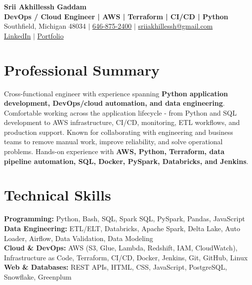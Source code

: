 \documentclass[letterpaper,10pt]{article}
\begin{document}
\fontsize{9.35pt}{10.45pt}\selectfont

\begin{center}
    {\LARGE \textbf{Srii Akhillessh Gaddam}} \\[-1pt]
    \textbf{DevOps / Cloud Engineer | AWS | Terraform | CI/CD | Python} \\[2pt]
    Southfield, Michigan 48034 $|$
    \href{tel:6468752400}{646-875-2400} $|$
    \href{mailto:sriiakhillessh@gmail.com}{sriiakhillessh@gmail.com} \\[1pt]
    \href{https://www.linkedin.com/in/srii-akhiilessh-gaddam-b48668191/}{LinkedIn} $|$
    \href{https://sriiakhillesshg.github.io/portfolio/}{Portfolio}
\end{center}
\vspace{-8pt}

\section{Professional Summary}
\small{Cross-functional engineer with experience spanning \textbf{Python application development, DevOps/cloud automation, and data engineering}. Comfortable working across the application lifecycle - from Python and SQL development to AWS infrastructure, CI/CD, monitoring, ETL workflows, and production support. Known for collaborating with engineering and business teams to remove manual work, improve reliability, and solve operational problems. Hands-on experience with \textbf{AWS, Python, Terraform, data pipeline automation, SQL, Docker, PySpark, Databricks, and Jenkins}.}

\section{Technical Skills}
\small{
\textbf{Programming:} Python, Bash, SQL, Spark SQL, PySpark, Pandas, JavaScript \\
\textbf{Data Engineering:} ETL/ELT, Databricks, Apache Spark, Delta Lake, Auto Loader, Airflow, Data Validation, Data Modeling \\
\textbf{Cloud \& DevOps:} AWS (S3, Glue, Lambda, Redshift, IAM, CloudWatch), Infrastructure as Code, Terraform, CI/CD, Docker, Jenkins, Git, GitHub, Linux \\
\textbf{Web \& Databases:} REST APIs, HTML, CSS, JavaScript, PostgreSQL, Snowflake, Greenplum
}
\end{document}
